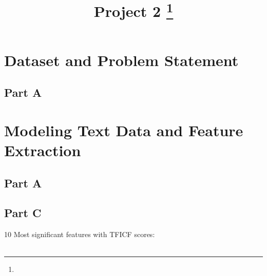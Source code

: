 \documentclass[11pt]{article}
\title{Project 2
\footnote{\s{EE 239AS ; Winter 2016 }
}
}
\begin{document}
\maketitle


\section{Dataset and Problem Statement}
\subsection{Part A}

\section{Modeling Text Data and Feature Extraction}
\subsection{Part A}

\subsection{Part C}

10 Most significant features with TFICF 
scores:\\
\\
\end{document}
